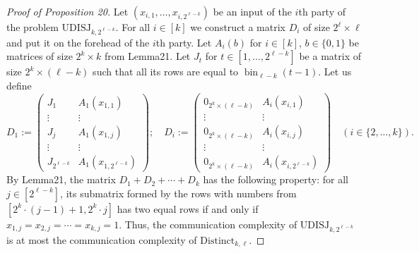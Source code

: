 \documentclass[10pt,a4paper]{article}
\begin{document}
\begin{proof}[Proof of Proposition 20]
Let $(x_{i,1},\ldots,x_{i,2^{\ell-k}})$ be an input of the $i$th party of the problem $\mathrm{UDISJ}_{k,2^{\ell-k}}$. For all $i\in[k]$ we construct a matrix $D_i$ of size $2^\ell\times\ell$ and put it on the forehead of the $i$th party. Let $A_i(b)$ for $i\in[k]$, $b\in\{0,1\}$ be matrices of size $2^k\times k$ from Lemma21. Let $J_t$ for $t\in[1,\ldots,2^{\ell-k}]$ be a matrix of size $2^k\times(\ell-k)$ such that all its rows are equal to $\operatorname{bin}_{\ell-k}(t-1)$. Let us define
\[
D_1:=\begin{pmatrix}J_1&A_1(x_{1,1})\\\vdots&\vdots\\J_j&A_1(x_{1,j})\\\vdots&\vdots\\J_{2^{\ell-k}}&A_1(x_{1,2^{\ell-k}})\end{pmatrix};
\quad
D_i:=\begin{pmatrix}0_{2^k\times(\ell-k)}&A_i(x_{i,1})\\\vdots&\vdots\\0_{2^k\times(\ell-k)}&A_i(x_{i,j})\\\vdots&\vdots\\0_{2^k\times(\ell-k)}&A_i(x_{i,2^{\ell-k}})\end{pmatrix}
\quad(i\in\{2,\ldots,k\}).
\]
By Lemma21, the matrix $D_1+D_2+\cdots+D_k$ has the following property: for all $j\in[2^{\ell-k}]$, its submatrix formed by the rows with numbers from $[2^k\cdot(j-1)+1,2^k\cdot j]$ has two equal rows if and only if $x_{1,j}=x_{2,j}=\cdots=x_{k,j}=1$. Thus, the communication complexity of $\mathrm{UDISJ}_{k,2^{\ell-k}}$ is at most the communication complexity of $\mathrm{Distinct}_{k,\ell}$.
\end{proof}
\end{document}
